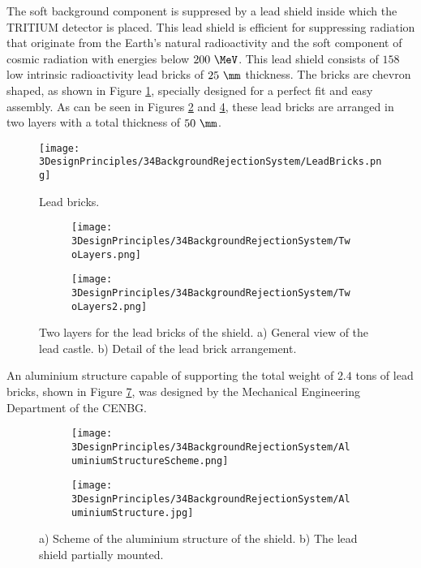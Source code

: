 The soft background component is suppresed by a lead shield inside which the TRITIUM detector is placed. This lead shield is efficient for suppressing radiation that originate from the Earth's natural radioactivity and the soft component of cosmic radiation with energies below $200~\MeV$. This lead shield consists of $158$ low intrinsic radioactivity lead bricks of $25~\mm$ thickness. The bricks are chevron shaped, as shown in Figure \ref{fig:LeadBrick}, specially designed for a perfect fit and easy assembly. As can be seen in Figures \ref{subfig:TwoLayers} and \ref{fig:LeadBricksAndArrangement}, these lead bricks are arranged in two layers with a total thickness of $50~\mm$. 
\begin{figure}[h]
\texttt{[image: 3DesignPrinciples/34BackgroundRejectionSystem/LeadBricks.png]}
\centering
\caption{Lead bricks.\label{fig:LeadBrick}}
\end{figure}
\begin{figure}[h]
\centering
    \begin{subfigure}[b]{0.5\textwidth}
    \centering
    \texttt{[image: 3DesignPrinciples/34BackgroundRejectionSystem/TwoLayers.png]}  
    \caption{\label{subfig:TwoLayers}}
    \end{subfigure}
    \hfill
    \begin{subfigure}[b]{0.4\textwidth}
    \centering
    \texttt{[image: 3DesignPrinciples/34BackgroundRejectionSystem/TwoLayers2.png]}  
    \caption{\label{subfig:TwoLayers2}}
    \end{subfigure}
 \caption{Two layers for the lead bricks of the shield. a) General view of the lead castle. b) Detail of the lead brick arrangement.}
 \label{fig:LeadBricksAndArrangement}
\end{figure}
An aluminium structure capable of supporting the total weight of $2.4$ tons of lead bricks, shown in Figure \ref{fig:AluminiumStructure}, was designed by the Mechanical Engineering Department of the CENBG.
\begin{figure}
\centering
    \begin{subfigure}[b]{0.5\textwidth}
    \centering
    \texttt{[image: 3DesignPrinciples/34BackgroundRejectionSystem/AluminiumStructureScheme.png]}  
    \caption{\label{subfig:AluminiumStructureScheme}}
    \end{subfigure}
    \hfill
    \begin{subfigure}[b]{0.45\textwidth}
    \centering
    \texttt{[image: 3DesignPrinciples/34BackgroundRejectionSystem/AluminiumStructure.jpg]}  
    \caption{\label{subfig:AluminiumStructure}}
    \end{subfigure}
    \caption{a) Scheme of the aluminium structure of the shield. b) The lead shield partially mounted.}
 \label{fig:AluminiumStructure}
\end{figure}
